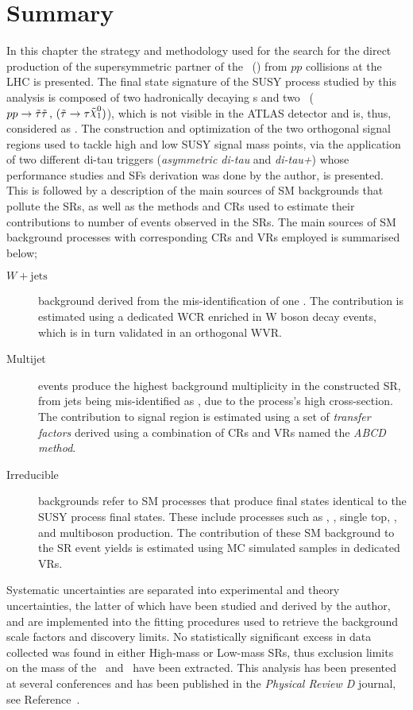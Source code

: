 	\section{Summary}
	In this chapter the strategy and methodology used for the search for the direct production of the supersymmetric partner of the \ltau\ (\stau) from $pp$ collisions at the \ac{LHC} is presented. 
	The final state signature of the \ac{SUSY} process studied by this analysis is composed of two hadronically decaying \ltau s and two \ninoone\  ($pp\rightarrow\stau\stau\,,\,(\stau\rightarrow\tau\ninoone)$), which is not visible in the \ac{ATLAS} detector and is, thus, considered as \met. 
	The construction and optimization of the two orthogonal signal regions used  to tackle high and low \ac{SUSY} signal mass points, via the application of two different di-tau triggers (\textit{asymmetric di-tau} and \textit{di-tau+\met}) whose performance studies and \acp{SF} derivation was done by the author, is presented. 	 
	This is followed by a description of the main sources of \ac{SM} backgrounds that pollute the \acp{SR}, as well as the methods and \acp{CR} used to estimate their contributions to number of events observed in the \acp{SR}.
	 The main sources of \ac{SM} background processes with corresponding \acp{CR} and \acp{VR} employed is summarised below;
	\begin{description}
	\item[\boldmath $W+\mathrm{jets}$] background derived from the mis-identification of one \ltau. The \Wjets contribution is estimated using a dedicated W\ac{CR} enriched in W boson decay events, which is in turn validated in an orthogonal W\ac{VR}.
	\item[Multijet] events produce the highest background multiplicity in the constructed \ac{SR}, from jets being mis-identified as \ltau, due to the process's high cross-section. The contribution to signal region is estimated using a set of \textit{transfer factors} derived using a combination of \acp{CR} and \acp{VR} named the \textit{ABCD method}.
	\item[Irreducible] backgrounds refer to \ac{SM} processes that produce final states identical to the \ac{SUSY} process final states. These include processes such as \Zjets, \ttbar, single top, \ttV, and multiboson production. The contribution of these \ac{SM} background to the \ac{SR} event yields is estimated using \ac{MC} simulated samples in dedicated \acp{VR}.
	\end{description}
	Systematic uncertainties are separated into experimental and theory uncertainties, the latter of which have been studied and derived by the author, and are implemented into the fitting procedures used to retrieve the background scale factors and discovery limits.
	No statistically significant excess in data collected was found in either High-mass or Low-mass \acp{SR}, thus exclusion limits on the mass of the \stau\ and \ninoone\ have been extracted. This analysis has been presented at several conferences and has been published in the \textit{Physical Review D} journal, see Reference~\cite{PhysRevD.101.032009}.
	\label{sec:sum}
	

			
